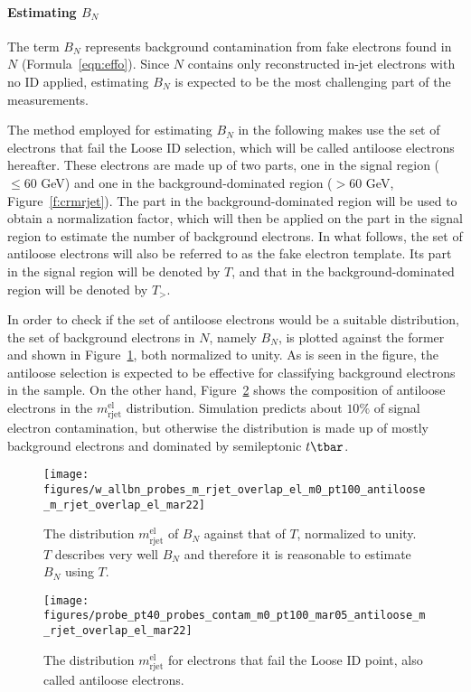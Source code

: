 \paragraph{Estimating $B_N$} The term $B_N$ represents background contamination
from fake electrons found in $N$ (Formula~\ref{eqn:effo}). Since $N$ contains
only reconstructed in-jet electrons with no ID applied, estimating $B_N$ is
expected to be the most challenging part of the measurements.

The method employed for estimating $B_N$ in the following makes use the set of
electrons that fail the Loose ID selection, which will be called antiloose
electrons hereafter. These electrons are made up of two parts, one in the
signal region ($\leq 60$ GeV) and one in the background-dominated region ($>
	60$ GeV, Figure~\ref{f:crmrjet}). The part in the background-dominated region
will be used to obtain a normalization factor, which will then be applied on
the part in the signal region to estimate the number of background electrons.
In what follows, the set of antiloose electrons will also be referred to as the
fake electron template. Its part in the signal region will be denoted by $T$,
and that in the background-dominated region will be denoted by $T_>$.

In order to check if the set of antiloose electrons would be a suitable
distribution, the set of background electrons in $N$, namely $B_N$, is plotted
against the former and shown in Figure~\ref{f:shapebeforeafter}, both
normalized to unity. As is seen in the figure, the antiloose selection is
expected to be effective for classifying background electrons in the sample. On
the other hand, Figure~\ref{f:antiloosemrjet} shows the composition of
antiloose electrons in the $m_{\text{rjet}}^{\text{el}}$ distribution.
Simulation predicts about $10\%$ of signal electron contamination, but
otherwise the distribution is made up of mostly background electrons and
dominated by semileptonic $t\tbar$.


\begin{figure}[H]
	\texttt{[image: figures/w\_allbn\_probes\_m\_rjet\_overlap\_el\_m0\_pt100\_antiloose\_m\_rjet\_overlap\_el\_mar22]}
	\centering
	\caption{The distribution $m_{\text{rjet}}^{\text{el}}$ of $B_N$ against that
		of $T$, normalized to unity. $T$ describes very well $B_N$ and therefore it is
		reasonable to estimate $B_N$ using $T$.}
	\label{f:shapebeforeafter}
\end{figure}

\begin{figure}[H]
	\texttt{[image: figures/probe\_pt40\_probes\_contam\_m0\_pt100\_mar05\_antiloose\_m\_rjet\_overlap\_el\_mar22]}
	\centering
	\caption{The distribution $m_{\text{rjet}}^{\text{el}}$ for electrons that fail
		the Loose ID point, also called antiloose electrons.}
	\label{f:antiloosemrjet}
\end{figure}

